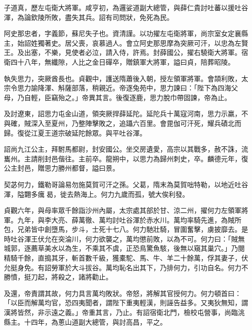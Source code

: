 \begin{pinyinscope}
 子道真，歷左屯衛大將軍。咸亨初，為邏娑道副大總管，與薛仁貴討吐蕃以援吐谷渾，為論欽陵所敗，盡失其兵。詔有司問狀，免死為民。



 阿史那忠者，字義節，蘇尼失子也。資清謹。以功擢左屯衛將軍，尚宗室女定襄縣主，始詔姓獨著史。居父喪，哀慕過人。會立阿史那思摩為突厥可汗，以忠為左賢王。及出塞，不樂，見使者必泣，請入侍，許焉。封薛國公，擢右驍衛大將軍。宿衛四十八年，無纖隙，人比之金日磾卒，贈鎮軍大將軍，謚曰貞，陪葬昭陵。



 執失思力，突厥酋長也。貞觀中，護送隋蕭後入朝，授左領軍將軍。會頡利敗，太宗令思力諭降渾、斛薩部落，稍親近。帝逐兔苑中，思力諫曰：「陛下為四海父母，乃自輕，臣竊殆之。」帝異其言。後復逐鹿，思力脫巾帶固諫，帝為止。



 及討遼東，詔思力屯金山道，領突厥捍薛延陀。延陀兵十萬寇河南，思力示羸，不與確，賊深入至夏州，乃整陣擊敗之，追躡六百里。會毘伽可汗死，耀兵磧北而歸。復從江夏王道宗破延陀餘眾。與平吐谷渾。



 詔尚九江公主，拜駙馬都尉，封安國公。坐交房遺愛，高宗以其戰多，赦不誅，流巂州。主請削封邑偕往。主前卒。龍朔中，以思力為歸州刺史，卒。麟德元年，復公主封邑，贈思力勝州都督，謚曰景。



 契苾何力，鐵勒哥論易勿施莫賀可汗之孫。父葛，隋末為莫賀咄特勒，以地近吐谷渾，隘翾多癘曷，徙去熱海上。何力九歲而孤，號大俟利發。



 貞觀六年，與母率眾千餘詣沙州內屬，太宗處其部於甘、涼二州，擢何力左領軍將軍。九年，與李大亮、薛萬徹、萬均討吐谷渾於赤水川。萬均率騎先進，為賊所包，兄弟皆中創墮馬，步斗，士死十七八。何力馳壯騎，冒圍奮擊，虜披靡去。是時吐谷渾王伏允在突淪川，何力欲襲之，萬均懲前敗，以為不可。何力曰：「賊無城郭，逐薦草美水以為生，不乘其不虞，正恐鳥驚魚駭，後無以窺其巢穴。」乃閱精騎千餘，直搗其牙，斬首數千級，獲橐駝、馬、牛、羊二十餘萬，俘其妻子，伏允挺身免。有詔勞軍於大斗拔谷。萬均恥名出其下，乃排何力，引功自名。何力不勝憤，挺刀起，將殺之，諸將勸止。



 及還，帝責謂其故，何力具言萬均敗狀。帝怒，將解其官授何力。何力頓首曰：「以臣而解萬均官，恐四夷聞者，謂陛下重夷輕漢，則誣告益多。又夷狄無知，謂漢將皆然，非示遠之義。」帝重其言，乃止。有詔宿衛北門，檢校屯營事，尚臨洮縣主。十四年，為蔥山道副大總管，與討高昌，平之。




\end{pinyinscope}

